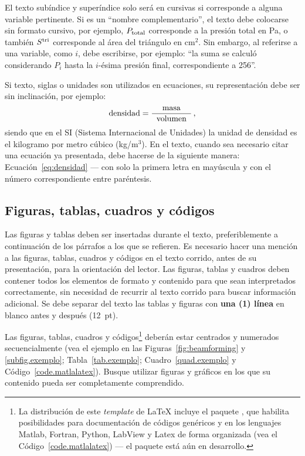 El texto subíndice y superíndice solo será en cursivas si corresponde a alguna variable pertinente. Si es un ``nombre complementario'', el texto debe colocarse sin formato cursivo, por ejemplo, $P_{\text{total}}$ corresponde a la presión total en Pa, o también $S^{\text{tri}}$ corresponde al área del triángulo en cm$^2$.
Sin embargo, al referirse a una variable, como $i$, debe escribirse, por ejemplo: ``la suma se calculó considerando $P_i$ hasta la $i$-ésima presión final, correspondiente a 256''.

Si texto, siglas o unidades son utilizados en ecuaciones, su representación debe ser sin inclinación, por ejemplo:
%
\begin{equation}
	\text{densidad} = \frac{\text{masa}}{\;\;\text{volumen}\;\;}\,,
\label{eq:densidad}
\end{equation}
%
siendo que en el SI (Sistema Internacional de Unidades) la unidad de densidad es el kilogramo por metro cúbico (kg/m$^3$).
En el texto, cuando sea necesario citar una ecuación ya presentada, debe hacerse de la siguiente manera: Ecuación~\eqref{eq:densidad} --- con solo la primera letra en mayúscula y con el número correspondiente entre paréntesis.

\subsection{Figuras, tablas, cuadros y códigos}

Las figuras y tablas deben ser insertadas durante el texto, preferiblemente a continuación de los párrafos a los que se refieren. Es necesario hacer una mención a las figuras, tablas, cuadros y códigos en el texto corrido, antes de su presentación, para la orientación del lector. Las figuras, tablas y cuadros deben contener todos los elementos de formato y contenido para que sean interpretados correctamente, sin necesidad de recurrir al texto corrido para buscar información adicional. Se debe separar del texto las tablas y figuras con \textbf{una (1) línea} en blanco antes y después (12~pt).


Las figuras, tablas, cuadros y códigos\footnote{La distribución de este \textit{template} de \LaTeX\xspace incluye el paquete , que habilita posibilidades para documentación de códigos genéricos y en los lenguajes Matlab, Fortran, Python, LabView y Latex de forma organizada (vea el Código~\ref{code.matlalatex}) --- el paquete está aún en desarrollo.} deberán estar centrados y numerados secuencialmente (vea el ejemplo en las Figuras~\ref{fig:beamforming} y \ref{subfig.exemplo}; Tabla~\ref{tab.exemplo}; Cuadro~\ref{quad.exemplo} y Código~\ref{code.matlalatex}). Busque utilizar figuras y gráficos en los que su contenido pueda ser completamente comprendido.

